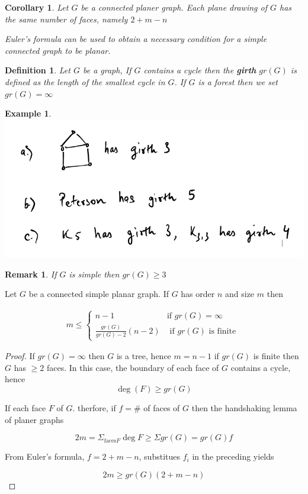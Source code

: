 \documentclass[12pt]{article}
\newenvironment{theorem}[1]{%
  \renewcommand\themanualtheoreminner{#1}%
  \manualtheoreminner
}{\endmanualtheoreminner}
\newtheorem*{corollary}{Corollary}
\newtheorem{example}{Example}
\newtheorem{definition}{Definition}
\newtheorem*{remark}{Remark}
\newenvironment{pro}{\begin{proof}}{\end{proof}}
\begin{document}
\begin{corollary}

  Let $G$ be a connected planer graph. Each plane drawing of $G$ has the same number of faces, namely $2+m - n$

  Euler's formula can be used to obtain a necessary condition for a simple connected graph to be planar.
\end{corollary}

\begin{definition}
Let $G$ be a graph, If $G$ contains a cycle then the \textbf{girth} $gr(G)$ is defined as the length of the smallest cycle in $G$. If $G$ is a forest then we set $gr(G) = \infty$
\end{definition}

\begin{example}

  \includegraphics[scale=0.5]{example}

\end{example}


\begin{remark}
  If $G$ is simple then $gr(G) \ge 3$
\end{remark}


\begin{theorem}{4}
  Let $G$ be a connected simple planar graph. If $G$ has order $n$ and size $m$ then

    \begin{align} m \le \begin{cases} n-1 & \text{if } gr(G) = \infty \\
                          \frac{gr(G)}{gr(G) - 2}(n-2) & \text{ if  } gr(G) \text{ is finite } \end{cases}
    \end{align}
\end{theorem}


\begin{pro}
  If $gr(G) = \infty$ then $G$ is a tree, hence $m = n-1$ if $gr(G)$ is finite then $G$ has $\ge 2$ faces. In this case, the boundary of each face of $G$ contains a cycle, hence
  \[\deg (F) \ge gr(G)\]

  If each face $F$ of $G$. therfore, if $f = \#$ of faces of $G$ then the handshaking lemma of planer graphs

  \[ 2m = \Sigma_{\text{faces} F} \deg F \ge \Sigma gr(G) = gr(G) f\]

  From Euler's formula, $f = 2+m-n$, substitues $f_{i}$ in the preceding yields

  \[2m \ge gr(G) (2+m-n)\]
\end{pro}
\end{document}
